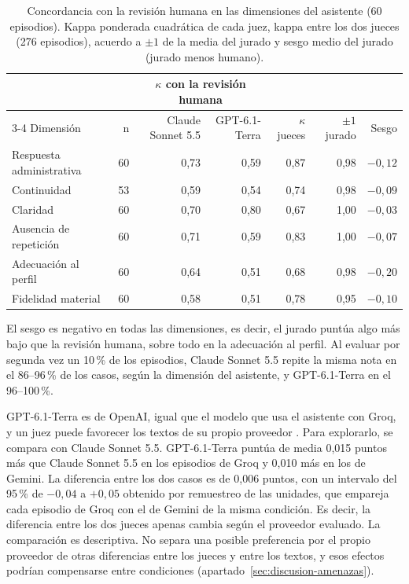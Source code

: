 \begin{table}[!htbp]
\centering
\small
\setlength{\tabcolsep}{4pt}
\caption[Concordancia del jurado con la revisión humana.]{Concordancia con la
revisión humana en las dimensiones del asistente (60 episodios). Kappa
ponderada cuadrática de cada juez, kappa entre los dos jueces (276
episodios), acuerdo a $\pm1$ de la media del jurado y sesgo medio del jurado
(jurado menos humano).}
\label{tab:juez-concordancia}
\begin{tabular}{lrrrrrr}\toprule
& & \multicolumn{2}{c}{$\kappa$ con la revisión humana} & & & \\
\cmidrule(lr){3-4}
Dimensión & n & Claude Sonnet 5.5 & GPT-6.1-Terra & $\kappa$ jueces & $\pm1$ jurado & Sesgo \\ \midrule
Respuesta administrativa & 60 & 0,73 & 0,59 & 0,87 & 0,98 & $-0{,}12$ \\
Continuidad & 53 & 0,59 & 0,54 & 0,74 & 0,98 & $-0{,}09$ \\
Claridad & 60 & 0,70 & 0,80 & 0,67 & 1,00 & $-0{,}03$ \\
Ausencia de repetición & 60 & 0,71 & 0,59 & 0,83 & 1,00 & $-0{,}07$ \\
Adecuación al perfil & 60 & 0,64 & 0,51 & 0,68 & 0,98 & $-0{,}20$ \\
Fidelidad material & 60 & 0,58 & 0,51 & 0,78 & 0,95 & $-0{,}10$ \\
\bottomrule\end{tabular}
\end{table}

El sesgo es negativo en todas las dimensiones, es decir, el jurado puntúa algo
más bajo que la revisión humana, sobre todo en la adecuación al perfil. Al
evaluar por segunda vez un 10\,\% de los episodios, Claude Sonnet 5.5 repite la
misma nota en el 86--96\,\% de los casos, según la dimensión del asistente, y
GPT-6.1-Terra en el 96--100\,\%.

GPT-6.1-Terra es de OpenAI, igual que el modelo que usa el asistente con Groq,
y un juez puede favorecer los textos de su propio proveedor
\citep{panickssery2024selfpreference}. Para explorarlo, se compara con Claude
Sonnet 5.5. GPT-6.1-Terra puntúa de media 0,015 puntos más que Claude Sonnet
5.5 en los episodios de Groq y 0,010 más en los de Gemini. La diferencia entre
los dos casos es de 0,006 puntos, con un intervalo del 95\,\% de $-0{,}04$ a
$+0{,}05$ obtenido por remuestreo de las unidades, que empareja cada episodio
de Groq con el de Gemini de la misma condición. Es decir, la diferencia entre
los dos jueces apenas cambia según el proveedor evaluado. La comparación es
descriptiva. No separa una posible preferencia por el propio proveedor de
otras diferencias entre los jueces y entre los textos, y esos efectos podrían
compensarse entre condiciones (apartado~\ref{sec:discusion-amenazas}).

